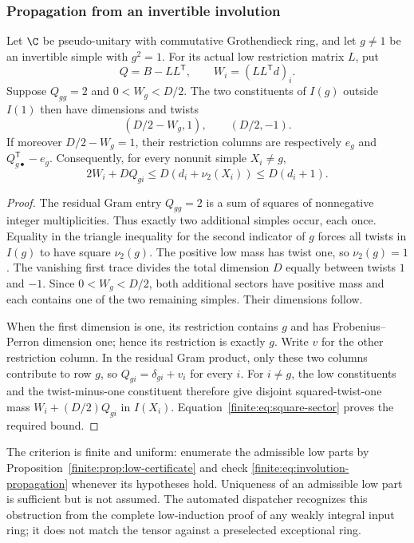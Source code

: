 \subsubsection{Propagation from an invertible involution}
\begin{proposition}\label{finite:prop:involution-propagation}
Let $\C$ be pseudo-unitary with commutative Grothendieck ring,
and let $g\ne1$ be an invertible
simple with $g^2=1$. For its actual low restriction matrix $L$, put
\[
 Q=B-LL^{\mathsf T},\qquad W_i=(LL^{\mathsf T}d)_i.
\]
Suppose $Q_{gg}=2$ and $0<W_g<D/2$. The two constituents of $I(g)$
outside $I(1)$ then have dimensions and twists
\[
 (D/2-W_g,1),\qquad(D/2,-1).
\]
If moreover $D/2-W_g=1$, their restriction columns are respectively
$e_g$ and $Q_{g\bullet}^{\mathsf T}-e_g$. Consequently, for every
nonunit simple $X_i\ne g$,
\begin{equation}\label{finite:eq:involution-propagation}
 2W_i+DQ_{gi}\leq D(d_i+\nu_2(X_i))\leq D(d_i+1).
\end{equation}
\end{proposition}
\begin{proof}
The residual Gram entry $Q_{gg}=2$ is a sum of squares of nonnegative
integer multiplicities. Thus exactly two additional simples occur,
each once. Equality in the triangle inequality for the second indicator
of $g$ forces all twists in $I(g)$ to have square $\nu_2(g)$.
The positive low mass has twist one, so $\nu_2(g)=1$.
The vanishing first trace divides the total dimension $D$ equally
between twists $1$ and $-1$. Since $0<W_g<D/2$, both additional
sectors have positive mass and each contains one of the two remaining
simples. Their dimensions follow.

When the first dimension is one, its restriction contains $g$ and has
Frobenius--Perron dimension one; hence its restriction is exactly $g$.
Write $v$ for the other restriction column. In the residual Gram product,
only these two columns contribute to row $g$, so
$Q_{gi}=\delta_{gi}+v_i$ for every $i$.
For $i\ne g$, the low constituents and the twist-minus-one constituent
therefore give disjoint squared-twist-one mass
$W_i+(D/2)Q_{gi}$ in $I(X_i)$. Equation~\eqref{finite:eq:square-sector}
proves the required bound.
\end{proof}
The criterion is finite and uniform: enumerate the admissible low parts
by Proposition~\ref{finite:prop:low-certificate} and check
\eqref{finite:eq:involution-propagation} whenever its hypotheses hold.
Uniqueness of an admissible low part is sufficient but is not assumed.
The automated dispatcher recognizes this obstruction from the complete
low-induction proof of any weakly integral input ring; it does not match
the tensor against a preselected exceptional ring.



